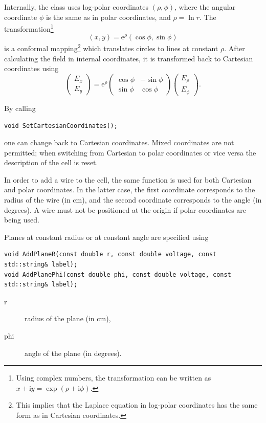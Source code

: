 Internally, the class uses log-polar coordinates $\left(\rho, \phi\right)$, 
where the angular coordinate $\phi$ is the same as in polar coordinates, 
and $\rho = \ln r$. The transformation\footnote{
Using complex numbers, the transformation can be written as 
$x + \text{i}y = \exp\left(\rho + \text{i}\phi\right)$.}
\begin{equation*}
\left(x, y\right) = \text{e}^{\rho}\left(\cos\phi, \sin\phi\right)
\end{equation*}
is a conformal mapping\footnote{This implies that the Laplace equation in log-polar coordinates has the same form as in Cartesian coordinates.} 
which translates circles to lines at constant $\rho$. 
After calculating the field in internal coordinates, it is transformed back to 
Cartesian coordinates using
\begin{equation*}
\begin{pmatrix}E_{x}\\E_{y}\end{pmatrix} = \text{e}^{\rho}
\begin{pmatrix}\cos\phi & -\sin\phi \\ \sin\phi & \cos\phi\end{pmatrix}
\begin{pmatrix}E_{\rho}\\E_{\phi}\end{pmatrix}. 
\end{equation*}

By calling 
\begin{lstlisting}
void SetCartesianCoordinates();
\end{lstlisting} 
one can change back to Cartesian coordinates. 
Mixed coordinates are not permitted; when switching from Cartesian to polar 
coordinates or vice versa the description of the cell is reset.

In order to add a wire 
to the cell, the same function is used 
for both Cartesian and polar coordinates. In the latter case, the 
first coordinate corresponds to the radius of the wire (in cm), 
and the second coordinate corresponds to the angle (in degrees). 
A wire must not be positioned at the origin if polar coordinates are being used.

Planes at constant radius or at constant angle are specified using
\begin{lstlisting}
void AddPlaneR(const double r, const double voltage, const std::string& label);
void AddPlanePhi(const double phi, const double voltage, const std::string& label);
\end{lstlisting}
\begin{description}
  \item[r] radius of the plane (in cm),
  \item[phi] angle of the plane (in degrees).
\end{description}

